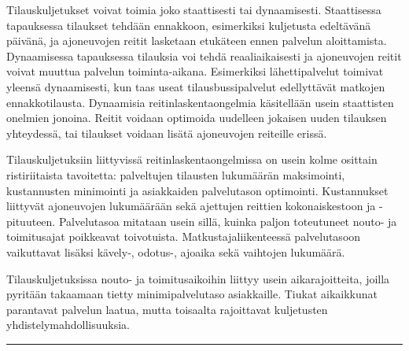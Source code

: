 \documentclass[a4paper,12pt]{article}
\newcommand*\sepline{%
  \begin{center}
    \rule[1ex]{.5\textwidth}{.5pt}
  \end{center}}
\begin{document}
Tilauskuljetukset voivat toimia joko staattisesti tai dynaamisesti. Staattisessa tapauksessa tilaukset tehdään ennakkoon, 
esimerkiksi kuljetusta edeltävänä päivänä, ja ajoneuvojen reitit lasketaan etukäteen ennen palvelun aloittamista. 
Dynaamisessa tapauksessa tilauksia voi tehdä reaaliaikaisesti ja ajoneuvojen reitit voivat muuttua palvelun toiminta-aikana.
Esimerkiksi lähettipalvelut toimivat yleensä dynaamisesti, kun taas useat tilausbussipalvelut edellyttävät matkojen ennakkotilausta. %
Dynaamisia reitinlaskentaongelmia käsitellään usein staattisten onelmien jonoina. Reitit voidaan optimoida uudelleen jokaisen uuden 
tilauksen yhteydessä, tai tilaukset voidaan lisätä ajoneuvojen reiteille erissä. 

Tilauskuljetuksiin liittyvissä reitinlaskentaongelmissa on usein kolme osittain ristiriitaista tavoitetta:
palveltujen tilausten lukumäärän maksimointi, kustannusten minimointi ja asiakkaiden palvelutason optimointi.
Kustannukset liittyvät ajoneuvojen lukumäärään sekä ajettujen reittien kokonaiskestoon ja -pituuteen.
Palvelutasoa mitataan usein sillä, kuinka paljon toteutuneet nouto- ja toimitusajat poikkeavat toivotuista. 
Matkustajaliikenteessä palvelutasoon vaikuttavat lisäksi kävely-, odotus-, ajoaika sekä vaihtojen lukumäärä.

Tilauskuljetuksissa nouto- ja toimitusaikoihin liittyy usein aikarajoitteita, %
joilla pyritään takaamaan tietty minimipalvelutaso asiakkaille. Tiukat aikaikkunat parantavat palvelun laatua,
mutta toisaalta rajoittavat kuljetusten yhdistelymahdollisuuksia.

\sepline


\end{document}
